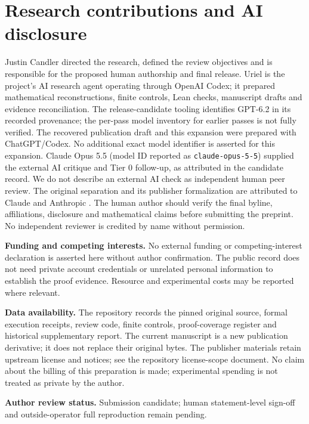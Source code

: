 \documentclass[11pt,letterpaper]{article}
\theoremstyle{definition}\newtheorem{definition}[theorem]{Definition}\newtheorem{example}[theorem]{Example}
\theoremstyle{remark}\newtheorem{remark}[theorem]{Remark}
\begin{document}
\section*{Research contributions and AI disclosure}
Justin Candler directed the research, defined the review objectives and is responsible for the proposed human authorship and final release. Uriel is the project's AI research agent operating through OpenAI Codex; it prepared mathematical reconstructions, finite controls, Lean checks, manuscript drafts and evidence reconciliation. The release-candidate tooling identifies GPT-6.2 in its recorded provenance; the per-pass model inventory for earlier passes is not fully verified. The recovered publication draft and this expansion were prepared with ChatGPT/Codex. No additional exact model identifier is asserted for this expansion. Claude Opus 5.5 (model ID reported as \texttt{claude-opus-5-5}) supplied the external AI critique and Tier 0 follow-up, as attributed in the candidate record. We do not describe an external AI check as independent human peer review. The original separation and its publisher formalization are attributed to Claude and Anthropic \cite{claude}. The human author should verify the final byline, affiliations, disclosure and mathematical claims before submitting the preprint. No independent reviewer is credited by name without permission.\par
\textbf{Funding and competing interests.} No external funding or competing-interest declaration is asserted here without author confirmation. The public record does not need private account credentials or unrelated personal information to establish the proof evidence. Resource and experimental costs may be reported where relevant.\par
\textbf{Data availability.} The repository records the pinned original source, formal execution receipts, review code, finite controls, proof-coverage register and historical supplementary report. The current manuscript is a new publication derivative; it does not replace their original bytes. The publisher materials retain upstream license and notices; see the repository license-scope document. No claim about the billing of this preparation is made; experimental spending is not treated as private by the author.\par
\textbf{Author review status.} Submission candidate; human statement-level sign-off and outside-operator full reproduction remain pending.
\end{document}
